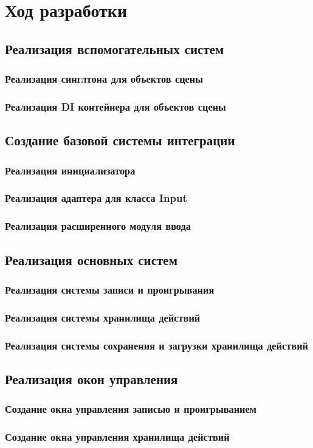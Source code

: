 \chapter{Ход разработки}
\label{cha:ch_2}
\section{Реализация вспомогательных систем}

\subsection{Реализация синглтона для объектов сцены}
\subsection{Реализация DI контейнера для объектов сцены}

\section{Создание базовой системы интеграции}

\subsection{Реализация инициализатора}
\subsection{Реализация адаптера для класса Input}
\subsection{Реализация расширенного модуля ввода}

\section{Реализация основных систем}

\subsection{Реализация системы записи и проигрывания}
\subsection{Реализация системы хранилища действий}
\subsection{Реализация системы сохранения и загрузки хранилища действий}

\section{Реализация окон управления}

\subsection{Создание окна управления записью и проигрыванием}
\subsection{Создание окна управления хранилища действий}
